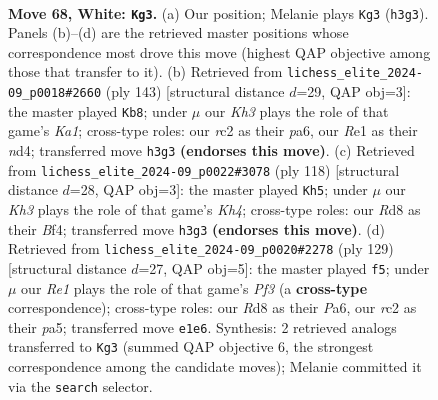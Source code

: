 \documentclass[11pt]{article}
\begin{document}
\clearpage

\begin{figure}[p]\centering
\begin{subfigure}{0.46\textwidth}\centering
\resizebox{\linewidth}{!}{%
\newchessgame
\chessboard[
  setfen={3R4/1p5p/1k4pP/5p2/pn3P2/7K/2r5/4R3 w - - 0 68},
  showmover=false,
  pgfstyle=straightmove, color=movearrow, markmove={h3-g3}
]}
\caption{}
\end{subfigure}\hfill
\begin{subfigure}{0.46\textwidth}\centering
\resizebox{\linewidth}{!}{%
\newchessgame
\chessboard[
  setfen={k7/4K3/P3P3/8/3N1Pp1/6P1/7P/8 b - - 0 72},
  showmover=false,
  pgfstyle=straightmove, color=movearrow, markmove={a8-b8}
]}
\caption{}
\end{subfigure}
\\[4pt]
\begin{subfigure}{0.46\textwidth}\centering
\resizebox{\linewidth}{!}{%
\newchessgame
\chessboard[
  setfen={4r3/1k1n4/1p3p1P/p7/P4B1K/2P5/8/6R1 w - - 5 60},
  showmover=false,
  pgfstyle=straightmove, color=movearrow, markmove={h4-h5}
]}
\caption{}
\end{subfigure}\hfill
\begin{subfigure}{0.46\textwidth}\centering
\resizebox{\linewidth}{!}{%
\newchessgame
\chessboard[
  setfen={5k1K/1N5P/p4p2/P2p4/2pP4/2P5/1P6/8 b - - 0 65},
  showmover=false,
  pgfstyle=straightmove, color=movearrow, markmove={f6-f5}
]}
\caption{}
\end{subfigure}
\caption{\textbf{Move 68, White: \texttt{Kg3}.} (a) Our position; Melanie plays \texttt{Kg3} (\texttt{h3g3}). Panels (b)--(d) are the retrieved master positions whose correspondence most drove this move (highest QAP objective among those that transfer to it). (b) Retrieved from \texttt{lichess\_elite\_2024-09\_p0018\#2660} (ply 143) [structural distance $d$=29, QAP obj=3]: the master played \texttt{Kb8}; under $\mu$ our \emph{Kh3} plays the role of that game's \emph{Ka1}; cross-type roles: our \emph{r}c2 as their \emph{p}a6, our \emph{R}e1 as their \emph{n}d4; transferred move \texttt{h3g3} \textbf{(endorses this move)}. (c) Retrieved from \texttt{lichess\_elite\_2024-09\_p0022\#3078} (ply 118) [structural distance $d$=28, QAP obj=3]: the master played \texttt{Kh5}; under $\mu$ our \emph{Kh3} plays the role of that game's \emph{Kh4}; cross-type roles: our \emph{R}d8 as their \emph{B}f4; transferred move \texttt{h3g3} \textbf{(endorses this move)}. (d) Retrieved from \texttt{lichess\_elite\_2024-09\_p0020\#2278} (ply 129) [structural distance $d$=27, QAP obj=5]: the master played \texttt{f5}; under $\mu$ our \emph{Re1} plays the role of that game's \emph{Pf3} (a \textbf{cross-type} correspondence); cross-type roles: our \emph{R}d8 as their \emph{P}a6, our \emph{r}c2 as their \emph{p}a5; transferred move \texttt{e1e6}. Synthesis: 2 retrieved analogs transferred to \texttt{Kg3} (summed QAP objective 6, the strongest correspondence among the candidate moves); Melanie committed it via the \texttt{search} selector.}
\label{fig:thought-m134}
\end{figure}
\end{document}

